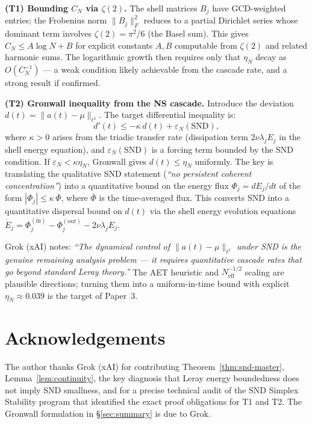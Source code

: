 \documentclass[12pt]{amsart}
\theoremstyle{definition}
\begin{document}
\medskip
\noindent\textbf{(T1) Bounding $C_N$ via $\zeta(2)$.}
The shell matrices $B_j$ have GCD-weighted entries; the Frobenius norm
$\|B_j\|_F^2$ reduces to a partial Dirichlet series whose dominant
term involves $\zeta(2)=\pi^2/6$ (the Basel sum).
This gives $C_N\le A\log N + B$ for explicit constants $A, B$
computable from $\zeta(2)$ and related harmonic sums.
The logarithmic growth then requires only that $\eta_N$ decay as
$O(C_N^{-1})$ — a weak condition likely achievable from the cascade
rate, and a strong result if confirmed.

\medskip
\noindent\textbf{(T2) Gronwall inequality from the NS cascade.}
Introduce the deviation $d(t)=\|a(t)-\mu\|_{\ell^1}$.
The target differential inequality is:
\[
d'(t)\le -\kappa\,d(t)+\varepsilon_N(\mathrm{SND}),
\]
where $\kappa>0$ arises from the triadic transfer rate (dissipation
term $2\nu\lambda_j E_j$ in the shell energy equation), and
$\varepsilon_N(\mathrm{SND})$ is a forcing term bounded by the
SND condition.
If $\varepsilon_N<\kappa\eta_N$, Gronwall gives $d(t)\le\eta_N$
uniformly.
The key is translating the qualitative SND statement
(\emph{``no persistent coherent concentration''}) into a
quantitative bound on the energy flux $\Phi_j=dE_j/dt$
of the form $|\Phi_j|\le\kappa\,\bar\Phi$, where $\bar\Phi$
is the time-averaged flux.
This converts SND into a quantitative dispersal bound on
$d(t)$ via the shell energy evolution equations
$\dot E_j = \Phi_j^{(\mathrm{in})}-\Phi_j^{(\mathrm{out})}
-2\nu\lambda_j E_j$.

\medskip
\noindent
Grok (xAI) notes: \emph{``The dynamical control of
$\|a(t)-\mu\|_{\ell^1}$ under SND is the genuine remaining
analysis problem — it requires quantitative cascade rates that
go beyond standard Leray theory.''}
The AET heuristic and $N_{\mathrm{eff}}^{-1/2}$ scaling are
plausible directions; turning them into a uniform-in-time bound
with explicit $\eta_N\approx0.039$ is the target of Paper~3.

\section*{Acknowledgements}

The author thanks Grok (xAI) for contributing
Theorem~\ref{thm:snd-master}, Lemma~\ref{lem:continuity},
the key diagnosis that Leray energy boundedness does not
imply SND smallness, and for a precise technical audit of the
SND Simplex Stability program that identified the exact
proof obligations for T1 and T2.
The Gronwall formulation in \S\ref{sec:summary} is due to Grok.
\end{document}
